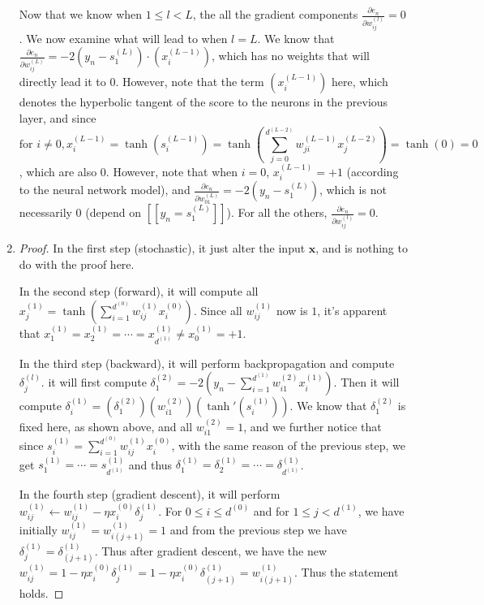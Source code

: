 \documentclass[11pt]{article}
\begin{document}
\begin{enumerate}[label=\textbf{\arabic*}.]
  Now that we know when $1\leq l < L$, the all the gradient components $\frac{\partial e_n}{\partial w_{ij}^{(l)}} = 0$. We now examine what will lead to when $l = L$. We know that $\frac{\partial e_n}{\partial w_{ij}^{(L)}} = -2\left(y_n - s_1^{(L)}\right)\cdot\left(x_i^{(L-1)}\right)$, which has no weights that will directly lead it to 0. However, note that the term $\left(x_i^{(L-1)}\right)$ here, which denotes the hyperbolic tangent of the score to the neurons in the previous layer, and since \[\text{for } i \neq 0, x_i^{(L-1)} = \tanh (s_i^{(L-1)}) = \tanh (\sum_{j=0}^{d^{(L-2)}}w_{ji}^{(L-1)}x_j^{(L-2)}) = \tanh(0) = 0\]
  , which are also 0. However, note that when $i = 0$, $x_i^{(L-1)} = +1$ (according to the neural network model), and $\frac{\partial e_n}{\partial w_{01}^{(L)}} = -2\left(y_n - s_1^{(L)}\right)$, which is not necessarily 0 (depend on $[\![ y_n = s_1^{(L)} ]\!]$). For all the others, $\frac{\partial e_n}{\partial w_{ij}^{(l)}} = 0$.

  \item \begin{proof} 
    In the first step (stochastic), it just alter the input $\mathbf{x}$, and is nothing to do with the proof here.\par
    In the second step (forward), it will compute all $x_j^{(1)} = \tanh \left(\sum_{i=1}^{d^{(0)}}w_{ij}^{(1)}x_i^{(0)}\right)$. Since all $w_{ij}^{(1)}$ now is $1$, it's apparent that $x_1^{(1)} = x_2^{(1)} = \cdots = x_{d^{(1)}}^{(1)} \neq x_0^{(1)} = +1$. \par
    In the third step (backward), it will perform backpropagation and compute $\delta_j^{(l)}$. it will first compute $\delta_1^{(2)} = -2 \left(y_n - \sum_{i=1}^{d^{(1)}}w_{i1}^{(2)}x_i^{(1)} \right)$. Then it will compute $\delta_i^{(1)} = \left(\delta_1^{(2)}\right)\left(w_{i1}^{(2)}\right) \left(\tanh'\left(s_i^{(1)}\right)\right)$. We know that $\delta_1^{(2)}$ is fixed here, as shown above, and all $w_{i1}^{(2)} = 1$, and we further notice that since $s_i^{(1)} = \sum_{i=1}^{d^{(0)}}w_{ij}^{(1)}x_i^{(0)}$, with the same reason of the previous step, we get $s_1^{(1)} = \cdots = s_{d^{(1)}}^{(1)}$ and thus $\delta_1^{(1)} = \delta_2^{(1)} = \cdots = \delta_{d^{(1)}}^{(1)}$. \par 
    In the fourth step (gradient descent), it will perform $w_{ij}^{(1)} \leftarrow w_{ij}^{(1)} - \eta x_i^{(0)}\delta_j^{(1)}$. For $0 \leq i \leq d^{(0)}$ and for $1 \leq j < d^{(1)}$, we have initially $w_{ij}^{(1)}=w_{i(j+1)}^{(1)}=1$ and from the previous step we have $\delta_j^{(1)} = \delta_{(j+1)}^{(1)}$. Thus after gradient descent, we have the new $w_{ij}^{(1)} = 1 - \eta x_i^{(0)}\delta_j^{(1)} = 1 - \eta x_i^{(0)}\delta_{(j+1)}^{(1)} = w_{i(j+1)}^{(1)}$. Thus the statement holds.


\end{proof}
\end{enumerate}
\end{document}
